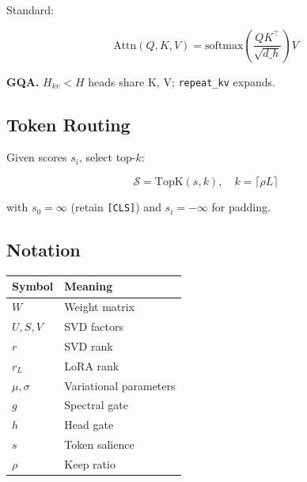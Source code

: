 Standard:

\[
\text{Attn}(Q, K, V) = \text{softmax}\!\left(\frac{QK^\top}{\sqrt{d\_h}}\right) V
\tag{3.6}
\]

\textbf{GQA.} $H_{kv} < H$ heads share K, V; \texttt{repeat\_kv} expands.

\subsection{Token Routing}

Given scores $s_i$, select top-$k$:

\[
\mathcal{S} = \text{TopK}(s, k), \quad k = \lceil \rho L \rceil
\tag{3.7}
\]

with $s_0 = \infty$ (retain \texttt{[CLS]}) and $s_i = -\infty$ for padding.

\subsection{Notation}

\begin{table}[H]
\centering
\small
\begin{tabular}{ll}
\toprule
\textbf{Symbol} & \textbf{Meaning} \\
\midrule
$W$ & Weight matrix \\
$U, S, V$ & SVD factors \\
$r$ & SVD rank \\
$r_L$ & LoRA rank \\
$\mu, \sigma$ & Variational parameters \\
$g$ & Spectral gate \\
$h$ & Head gate \\
$s$ & Token salience \\
$\rho$ & Keep ratio \\
\bottomrule
\end{tabular}
\end{table}


